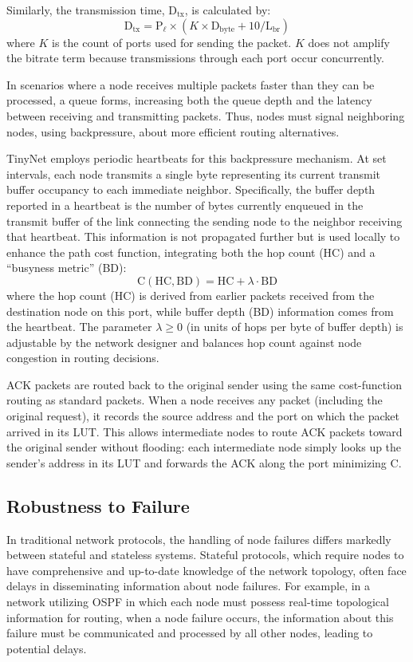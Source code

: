 Similarly, the transmission time, $\mathrm{D}_{\mathrm{tx}}$, is calculated by:
\begin{equation}
	\mathrm{D}_{\mathrm{tx}}=\mathrm{P}_\ell\times (K\times \mathrm{D}_{\mathrm{byte}} + 10/\mathrm{L}_\mathrm{br})
	\label{eq:dtx}
\end{equation}
where $K$ is the count of ports used for sending the packet. $K$ does not amplify the bitrate term because transmissions through each port occur concurrently.

In scenarios where a node receives multiple packets faster than they can be processed, a queue forms, increasing both the queue depth and the latency between receiving and transmitting packets. Thus, nodes must signal neighboring nodes, using backpressure, about more efficient routing alternatives.

TinyNet employs periodic heartbeats for this backpressure mechanism. At set intervals, each node transmits a single byte representing its current transmit buffer occupancy to each immediate neighbor. Specifically, the buffer depth reported in a heartbeat is the number of bytes currently enqueued in the transmit buffer of the link connecting the sending node to the neighbor receiving that heartbeat. This information is not propagated further but is used locally to enhance the path cost function, integrating both the hop count (HC) and a ``busyness metric'' (BD):
\begin{equation}
	\mathrm{C}(\mathrm{HC},\mathrm{BD})=\mathrm{HC}+\lambda\cdot\mathrm{BD}
	\label{eq:cost}
\end{equation}
where the hop count (HC) is derived from earlier packets received from the destination node on this port, while buffer depth (BD) information comes from the heartbeat. The parameter $\lambda \geq 0$ (in units of hops per byte of buffer depth) is adjustable by the network designer and balances hop count against node congestion in routing decisions.

ACK packets are routed back to the original sender using the same cost-function routing as standard packets. When a node receives any packet (including the original request), it records the source address and the port on which the packet arrived in its LUT. This allows intermediate nodes to route ACK packets toward the original sender without flooding: each intermediate node simply looks up the sender's address in its LUT and forwards the ACK along the port minimizing $\mathrm{C}$.

\subsection{Robustness to Failure}
In traditional network protocols, the handling of node failures differs markedly between stateful and stateless systems. Stateful protocols, which require nodes to have comprehensive and up-to-date knowledge of the network topology, often face delays in disseminating information about node failures. For example, in a network utilizing OSPF in which each node must possess real-time topological information for routing, when a node failure occurs, the information about this failure must be communicated and processed by all other nodes, leading to potential delays.

